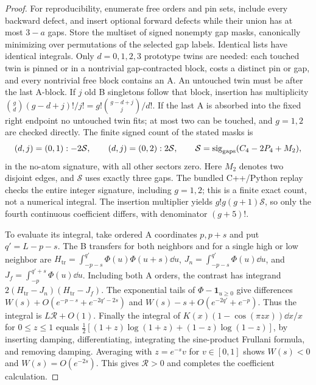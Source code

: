 \begin{proof}
For reproducibility, enumerate free orders and pin sets, include every backward defect, and insert optional forward defects while their union has at most \(3-a\) gaps. Store the multiset of signed nonempty gap masks, canonically minimizing over permutations of the selected gap labels. Identical lists have identical integrals. Only \(d=0,1,2,3\) prototype twins are needed: each touched twin is pinned or in a nontrivial gap-contracted block, costs a distinct pin or gap, and every nontrivial free block contains an A. An untouched twin must be after the last A-block. If \(j\) old B singletons follow that block, insertion has multiplicity
\(\binom gd(g-d+j)!/j!=g!\binom{g-d+j}j/d!\).
If the last A is absorbed into the fixed right endpoint no untouched twin fits; at most two can be touched, and \(g=1,2\) are checked directly. The finite signed count of the stated masks is
\[
(d,j)=(0,1): -2\mathcal S,\qquad (d,j)=(0,2): 2\mathcal S,
\qquad \mathcal S=\operatorname{sig}_{\rm gaps}(C_4-2P_4+M_2),
\]
in the no-atom signature, with all other sectors zero. Here \(M_2\) denotes two disjoint edges, and \(\mathcal S\) uses exactly three gaps. The bundled C++/Python replay checks the entire integer signature, including \(g=1,2\); this is a finite exact count, not a numerical integral. The insertion multiplier yields \(g!g(g+1)\mathcal S\), so only the fourth continuous coefficient differs, with denominator \((g+5)!\).

To evaluate its integral, take ordered A coordinates \(p,p+s\) and put \(q'=L-p-s\). The B transfers for both neighbors and for a single high or low neighbor are
\(H_{\mathrm{tr}}=\int_{-p-s}^{q'}\Phi(u)\Phi(u+s)\dd u\),
\(J_n=\int_{-p-s}^{q'}\Phi(u)\dd u\), and
\(J_f=\int_{-p}^{q'+s}\Phi(u)\dd u\).
Including both A orders, the contrast has integrand
\(2(H_{\mathrm{tr}}-J_n)(H_{\mathrm{tr}}-J_f)\).
The exponential tails of \(\Phi-\mathbf1_{u\ge0}\) give differences
\(W(s)+O(e^{-p-s}+e^{-2q'-2s})\) and \(W(s)-s+O(e^{-2q'}+e^{-p})\).
Thus the integral is \(L\mathcal R+O(1)\). Finally the integral of \(K(x)(1-\cos(\pi z x))\dd x/x\) for \(0\le z\le1\) equals
\(\tfrac12[(1+z)\log(1+z)+(1-z)\log(1-z)]\), by inserting damping, differentiating, integrating the sine-product Frullani formula, and removing damping. Averaging with \(z=e^{-s}v\) for \(v\in[0,1]\) shows \(W(s)<0\) and \(W(s)=O(e^{-2s})\). This gives \(\mathcal R>0\) and completes the coefficient calculation.
\end{proof}

